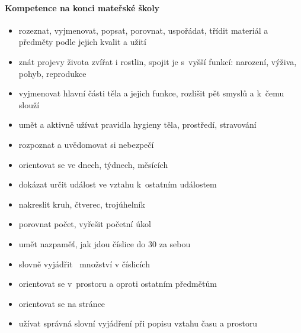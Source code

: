 			\paragraph{Kompetence na konci mateřské školy}
				\begin{itemize}
				\item rozeznat, vyjmenovat, popsat, porovnat, uspořádat, třídit materiál a předměty podle jejich kvalit a užití
				\item znát projevy života zvířat i rostlin, spojit je s vyšší funkcí: narození, výživa, pohyb, reprodukce
				\item vyjmenovat hlavní části těla a jejich funkce, rozlišit pět smyslů a k čemu slouží
				\item umět a aktivně užívat pravidla hygieny těla, prostředí, stravování
				\item rozpoznat a uvědomovat si nebezpečí
				\item orientovat se ve dnech, týdnech, měsících
				\item dokázat určit událost ve vztahu k ostatním událostem
				\item nakreslit kruh, čtverec, trojúhelník
				\item porovnat počet, vyřešit početní úkol
				\item umět nazpaměť, jak jdou číslice do 30 za sebou 
				\item slovně vyjádřit  množství v číslicích 
				\item orientovat se v prostoru a oproti ostatním předmětům
				\item orientovat se na stránce
				\item užívat správná slovní vyjádření při popisu vztahu času a prostoru
				\end{itemize}

